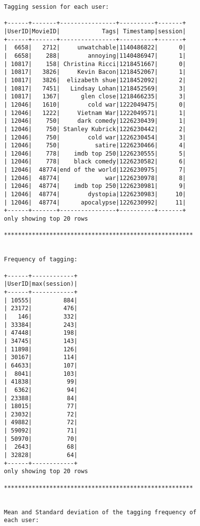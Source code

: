 \documentclass[11pt]{article}
\begin{document}
    \begin{Verbatim}[commandchars=\\\{\}]
Tagging session for each user: 

+------+-------+----------------+----------+-------+
|UserID|MovieID|            Tags| Timestamp|session|
+------+-------+----------------+----------+-------+
|  6658|   2712|     unwatchable|1140486822|      0|
|  6658|    288|        annoying|1140486947|      1|
| 10817|    158| Christina Ricci|1218451667|      0|
| 10817|   3826|     Kevin Bacon|1218452067|      1|
| 10817|   3826|  elizabeth shue|1218452092|      2|
| 10817|   7451|   Lindsay Lohan|1218452569|      3|
| 10817|   1367|      glen close|1218466235|      3|
| 12046|   1610|        cold war|1222049475|      0|
| 12046|   1222|     Vietnam War|1222049571|      1|
| 12046|    750|     dark comedy|1226230439|      1|
| 12046|    750| Stanley Kubrick|1226230442|      2|
| 12046|    750|        cold war|1226230454|      3|
| 12046|    750|          satire|1226230466|      4|
| 12046|    778|    imdb top 250|1226230555|      5|
| 12046|    778|    black comedy|1226230582|      6|
| 12046|  48774|end of the world|1226230975|      7|
| 12046|  48774|             war|1226230978|      8|
| 12046|  48774|    imdb top 250|1226230981|      9|
| 12046|  48774|        dystopia|1226230983|     10|
| 12046|  48774|      apocalypse|1226230992|     11|
+------+-------+----------------+----------+-------+
only showing top 20 rows

******************************************************


Frequency of tagging: 

+------+------------+
|UserID|max(session)|
+------+------------+
| 10555|         884|
| 23172|         476|
|   146|         332|
| 33384|         243|
| 47448|         198|
| 34745|         143|
| 11898|         126|
| 30167|         114|
| 64633|         107|
|  8041|         103|
| 41838|          99|
|  6362|          94|
| 23388|          84|
| 18015|          77|
| 23032|          72|
| 49882|          72|
| 59092|          71|
| 50970|          70|
|  2643|          68|
| 32828|          64|
+------+------------+
only showing top 20 rows

******************************************************


Mean and Standard deviation of the tagging frequency of
each user: 


\end{Verbatim}
\end{document}
